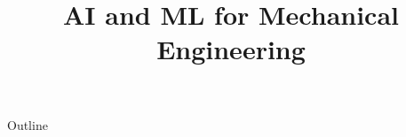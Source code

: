 \documentclass[xcolor=dvipsnames,compress,t,pdf,notes]{beamer}
\title[\insertframenumber /\inserttotalframenumber]{AI and ML for Mechanical Engineering}
\begin{document}
	\begin{frame}
	\titlepage
	\end{frame}
	
	\begin{frame}{Outline}
	    \tableofcontents
	\end{frame}

	
	
	
\end{document}
